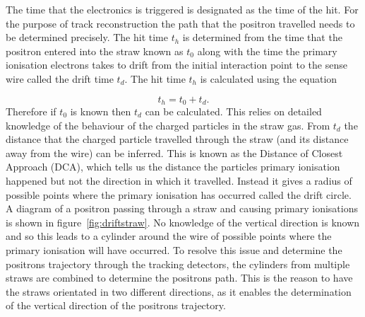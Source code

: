 The time that the electronics is triggered is designated as the time of the hit. For the purpose of track reconstruction the path that the positron travelled needs to be determined precisely. The hit time $t_{h}$ is determined from the time that the positron entered into the straw known as $t_{0}$ along with the time the primary ionisation electrons takes to drift from the initial interaction point to the sense wire called the drift time $t_{d}$. The hit time $t_{h}$ is calculated using the equation

\begin{equation}
t_{h} = t_{0} + t_{d}.
\end{equation}
\noindent
Therefore if $t_{0}$ is known then $t_{d}$ can be calculated. This relies on detailed knowledge of the behaviour of the charged particles in the straw gas. From $t_{d}$ the distance that the charged particle travelled through the straw (and its distance away from the wire) can be inferred. This is known as the Distance of Closest Approach (DCA), which tells us the distance the particles primary ionisation happened but not the direction in which it travelled. Instead it gives a radius of possible points where the primary ionisation has occurred called the drift circle. A diagram of a positron passing through a straw and causing primary ionisations is shown in figure~\ref{fig:driftstraw}. No knowledge of the vertical direction is known and so this leads to a cylinder around the wire of possible points where the primary ionisation will have occurred. To resolve this issue and determine the positrons trajectory through the tracking detectors, the cylinders from multiple straws are combined to determine the positrons path. This is the reason to have the straws orientated in two different directions, as it enables the determination of the vertical direction of the positrons trajectory. 

